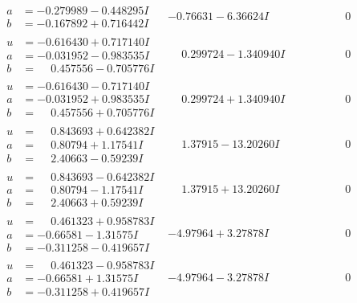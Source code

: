 \documentclass[1p]{elsarticle_modified}
\theoremstyle{definition}
\begin{document}
$$\begin{array}{c|c|c}
\begin{aligned}
a &= -0.279989 - 0.448295 I \\
b &= -0.167892 + 0.716442 I\end{aligned}
 & -0.76631 - 6.36624 I & \phantom{-0.000000 } 0 \\ \hline\begin{aligned}
u &= -0.616430 + 0.717140 I \\
a &= -0.031952 - 0.983535 I \\
b &= \phantom{-}0.457556 - 0.705776 I\end{aligned}
 & \phantom{-}0.299724 - 1.340940 I & \phantom{-0.000000 } 0 \\ \hline\begin{aligned}
u &= -0.616430 - 0.717140 I \\
a &= -0.031952 + 0.983535 I \\
b &= \phantom{-}0.457556 + 0.705776 I\end{aligned}
 & \phantom{-}0.299724 + 1.340940 I & \phantom{-0.000000 } 0 \\ \hline\begin{aligned}
u &= \phantom{-}0.843693 + 0.642382 I \\
a &= \phantom{-}0.80794 + 1.17541 I \\
b &= \phantom{-}2.40663 - 0.59239 I\end{aligned}
 & \phantom{-}1.37915 - 13.20260 I & \phantom{-0.000000 } 0 \\ \hline\begin{aligned}
u &= \phantom{-}0.843693 - 0.642382 I \\
a &= \phantom{-}0.80794 - 1.17541 I \\
b &= \phantom{-}2.40663 + 0.59239 I\end{aligned}
 & \phantom{-}1.37915 + 13.20260 I & \phantom{-0.000000 } 0 \\ \hline\begin{aligned}
u &= \phantom{-}0.461323 + 0.958783 I \\
a &= -0.66581 - 1.31575 I \\
b &= -0.311258 - 0.419657 I\end{aligned}
 & -4.97964 + 3.27878 I & \phantom{-0.000000 } 0 \\ \hline\begin{aligned}
u &= \phantom{-}0.461323 - 0.958783 I \\
a &= -0.66581 + 1.31575 I \\
b &= -0.311258 + 0.419657 I\end{aligned}
 & -4.97964 - 3.27878 I & \phantom{-0.000000 } 0 \\ \hline\begin{aligned}

\end{aligned}
\end{array}$$
\end{document}
